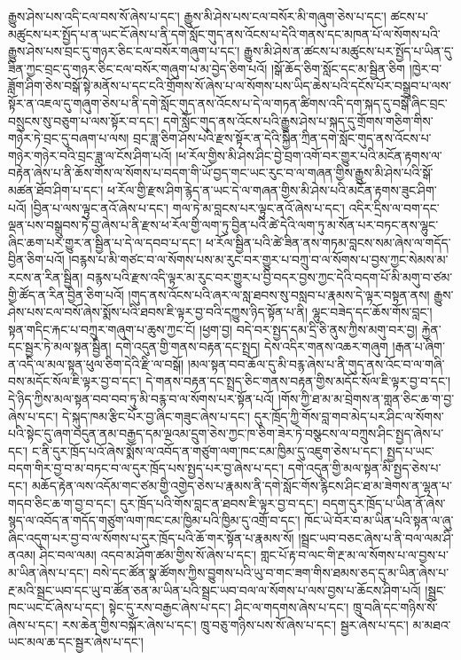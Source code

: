 རྒྱུས་ཤེས་པས་འདི་ངལ་བས་སོ་ཞེས་པ་དང་། རྒྱུས་མི་ཤེས་པས་ངལ་བསོར་མི་གཞུག་ཅེས་པ་དང་། ཚངས་པ་མཚུངས་པར་སྤྱོད་པ་ན་ཡང་ངོ་ཞེས་པ་ནི་དགེ་སློང་གུད་ནས་འོངས་པ་དེའི་གནས་དང་མཁན་པོ་ལ་སོགས་པའི་རྒྱུས་ཤེས་པས་བྲང་དུ་གཉར་ཅིང་ངལ་བསོར་གཞུག་པ་དང་། རྒྱུས་མི་ཤེས་ན་ཚངས་པ་མཚུངས་པར་སྤྱོད་པ་ཡིན་དུ་ཟིན་ཀྱང་བྲང་དུ་གཉར་ཅིང་ངལ་བསོར་གཞུག་པ་མ་བྱེད་ཅིག་པའོ། །སྒོ་ཆོད་ཅིག་སློང་དང་མ་སྦྱིན་ཅིག །ཁྱེར་བ་ཟློག་ཤིག་ཅེས་བསྒོ་སྟེ་མནོས་པ་དང་ངའི་གྲོགས་སོ་ཞེས་པ་ལ་སོགས་པས་ཡིད་ཆེས་པའི་དངོས་པོར་བསྒྲུབ་པ་ལས་སྟོར་ན་འཇལ་དུ་གཞུག་ཅེས་པ་ནི་དགེ་སློང་གུད་ནས་འོངས་པ་དེ་ལ་གཏན་ཚིགས་འདི་དག་སྐད་དུ་བསྒོ་ཞིང་བྲང་བསྲུངས་སུ་བཅུག་པ་ལས་སྟོར་བ་དང་། དགེ་སློང་གུད་ནས་འོངས་པའི་རྒྱུས་ཤེས་པ་སྐད་དུ་གྲོགས་གཅིག་གིས་གཉེར་ཏེ་བྲང་དུ་བཞག་པ་ལས། བྲང་ཟླ་ཅིག་ཤོས་པའི་རྫས་སྟོར་ན་དེའི་སྐྱིན་ཀྲིན་དགེ་སློང་གུད་ནས་འོངས་པ་གཉེར་གཉེར་བའི་བྲང་ཟླ་ལ་ངོས་ཤིག་པའོ། །ཕ་རོལ་གྱིས་མི་ཤེས་ཤིང་བྱེ་བྲག་འགོ་བར་གྱུར་པའི་མངོན་རྟགས་ལ་བརྟེན་ཞེས་པ་ནི་ཆོས་གོས་ལ་སོགས་པ་བདག་གི་ཡོ་བྱད་གང་ཡང་རུང་བ་ལ་གཞན་གྱིས་རྒྱུས་མི་ཤེས་པའི་སྒོ་མཚན་ཐོབ་ཤིག་པ་དང་། ཕ་རོལ་གྱི་རྫས་ཤིག་རྙེད་ན་ཡང་དེ་ལ་གཞན་གྱིས་མི་ཤེས་པའི་མངོན་རྟགས་ཟུང་ཤིག་པའོ། །བྱིན་པ་ལས་ལྟུང་ནའོ་ཞེས་པ་དང་། གལ་ཏེ་མ་བླངས་པར་ལྟུང་ནའོ་ཞེས་པ་དང་། འདིར་དྲིས་ལ་བག་དང་ལྡན་པས་བསྒྲུབས་ཏེ་བྱ་ཞེས་པ་ནི་རྫས་ཕ་རོལ་གྱི་ལག་ཏུ་བྱིན་པའི་ཚེ་དེའི་ལག་ཏུ་མ་སོན་པར་བཏང་ནས་ལྷུང་ཞིང་ཆག་པར་གྱུར་ན་སྦྱིན་པ་དེ་ལ་དབབ་པ་དང་། ཕ་རོལ་སྦྱིན་པའི་ཚེ་ཟིན་ནས་གཏམ་བླངས་སམ་ཞེས་ལ་གདོད་བྱིན་ཅིག་པའོ། །བརྙས་པ་མི་གཙང་བ་ལ་སོགས་པས་མ་རུང་བར་གྱུར་པ་བཀྲུ་བ་ལ་སོགས་པ་བྱས་ཀྱང་སེམས་མ་རངས་ན་རིན་སྦྱིན། བརྙས་པའི་རྫས་འདི་ལྟར་མ་རུང་བར་གྱུར་པ་བྱི་བདར་བྱས་ཀྱང་དེའི་བདག་པོ་མི་མགུ་བ་ཙམ་གྱི་ཚོད་ན་རིན་བྱིན་ཅིག་པའོ། །གུད་ནས་འོངས་པའི་ཞར་ལ་སླ་ཐབས་སུ་བསླབ་པ་རྣམས་དེ་ལྟར་བསྟན་ནས། རྒྱུས་ཤེས་པས་ངལ་བསོ་ཞེས་སྨོས་པའི་ཐབས་ཇི་ལྟར་བྱ་བའི་དཀྱུས་ཉིད་སྟོན་པ་ནི། ལྷུང་བཟེད་དང་ཆོས་གོས་བླང་། སྟན་གདིང་རྐང་པ་བཀྲུར་གཞུག་པ་ཆུས་ཀྱང་ངོ། །ཕྱག་བྱ། བདེ་བར་སྤྱད་དམ་དྲི་ཅི་ནུས་ཀྱིས་མགུ་བར་བྱ། རྐྱེན་དང་སྦྱར་ཏེ་མལ་སྟན་སྦྱིན། དགེ་འདུན་གྱི་གནས་བརྟན་དང་སྤྲད། དེས་འདིར་གནས་འཆར་གཞུག །རྒན་པ་ཞིག་ན་འདི་ལ་མལ་སྟན་ཕུལ་ཅིག་དེའི་རྫི་ལ་བསྒོ། །མལ་སྟན་བབ་ཆོལ་དུ་མི་བརྙ་ཞེས་པ་ནི་གུད་ནས་འོང་བ་ལ་གཞི་བས་མདོང་སོལ་ཇི་ལྟར་བྱ་བ་དང་། དེ་གནས་བརྟན་དང་སྤྲད་ཅིང་གནས་བརྟན་གྱིས་མདོང་སོལ་ཇི་ལྟར་བྱ་བ་དང་། དེ་ཉིད་ཀྱིས་མལ་སྟན་བབ་བབ་ཏུ་མི་བརྙ་བ་ལ་སོགས་པར་སྟོན་པའོ། །གོས་ཀྱི་ཐ་མ་མ་བྲེགས་ན་གླན་ཅིང་ཆ་ག་བྱ་ཞེས་པ་དང་། དེ་སྐུད་ཁམ་རྩིང་པོར་བྱ་ཞིང་གཟུང་ཞེས་པ་དང་། དུར་ཁྲོད་ཀྱི་གོས་བླ་གབ་མེད་པར་ཤིང་ལ་སོགས་པའི་སྟེང་དུ་ཞག་བདུན་ནམ་བརྒྱད་དམ་ལྔའམ་དྲུག་ཅེས་ཀྱང་ཁ་ཅིག་ཟེར་ཏེ་བསྩངས་ལ་བཀྲུས་ཤིང་སྤྱད་ཞེས་པ་དང་། ང་ནི་དུར་ཁྲོད་པའོ་ཞེས་སྨོས་ལ་འབོད་ན་གཙུག་ལག་ཁང་ངམ་ཁྱིམ་དུ་འཇུག་ཅེས་པ་དང་། སྤྱད་པ་ཡང་བདག་གིར་བྱ་བ་མ་བཏང་བ་ལ་དུར་ཁྲོད་པས་སྤྱད་པར་བྱ་ཞེས་པ་དང་། དགེ་འདུན་གྱི་མལ་སྟན་མི་སྤྱད་ཅེས་པ་དང་། མཆོད་རྟེན་ལས་འདོམ་གང་ཙམ་གྱི་འགྱེད་ཅེས་པ་རྣམས་ནི་དགེ་སློང་གོས་རྙིངས་ཤིང་ཐ་མ་ཟེགས་ན་ལྷན་པ་གདབ་ཅིང་ཆ་ག་བྱ་བ་དང་། དུར་ཁྲོད་པའི་གོས་བླང་ན་ཐབས་ཇི་ལྟར་བྱ་བ་དང་། བདག་དུར་ཁྲོད་པ་ཡིན་ནོ་ཞེས་སྙད་ལ་འབོད་ན་གདོད་གཙུག་ལག་ཁང་ངམ་ཁྱིམ་པའི་ཁྱིམ་དུ་འགྲོ་བ་དང་། ཁོང་ཡེ་བོར་བ་མ་ཡིན་པའི་སྟན་ལ་ཞུ་ཞིང་འདུག་པར་བྱ་བ་ལ་སོགས་པ་དུར་ཁྲོད་པའི་ཆོ་གར་སྟོན་པ་རྣམས་སོ། །སྦྲང་ཡབ་བཅང་ཞེས་པ་ནི་བལ་ལམ་ཤི་ནའམ། ཤིང་བལ་ལམ། འདབ་མ་ཤོག་ཚམ་གྱིས་སོ་ཞེས་པ་དང་། གླང་པོ་རྟ་བ་ལང་གི་རྔ་མ་ལ་སོགས་པ་ལ་བྱས་པ་མ་ཡིན་ཞེས་པ་དང་། བསེ་དང་ཚོན་སྣ་ཚོགས་ཀྱིས་བྱུགས་པའི་ཡུ་བ་གང་ཟག་གིས་ཐམས་ཅད་དུ་མ་ཡིན་ཞེས་པ་རྔ་མའི་སྦྲང་ཡབ་དང་ཡུ་བ་ཚོན་ཅན་མ་ཡིན་པའི་སྦྲང་ཡབ་བལ་ལ་སོགས་པ་ལས་བྱས་པ་ཆོངས་ཤིག་པའོ། །སྦྲང་ཁང་ཡང་ངོ་ཞེས་པ་དང་། སྟེང་དུ་རས་བརྒྱང་ཞེས་པ་དང་། ཤིང་ལ་གདགས་ཞེས་པ་དང་། ཁྲུ་བཞི་དང་གཉིས་སོ་ཞེས་པ་དང་། རས་ཆེན་གྱིས་བསྐོར་ཞེས་པ་དང་། ཁྲུ་བཅུ་གཉིས་པས་སོ་ཞེས་པ་དང་། སྦྱར་ཞེས་པ་དང་། མ་མཐའ་ཡང་མལ་ཆ་དང་སྦྱར་ཞེས་པ་དང་། 
